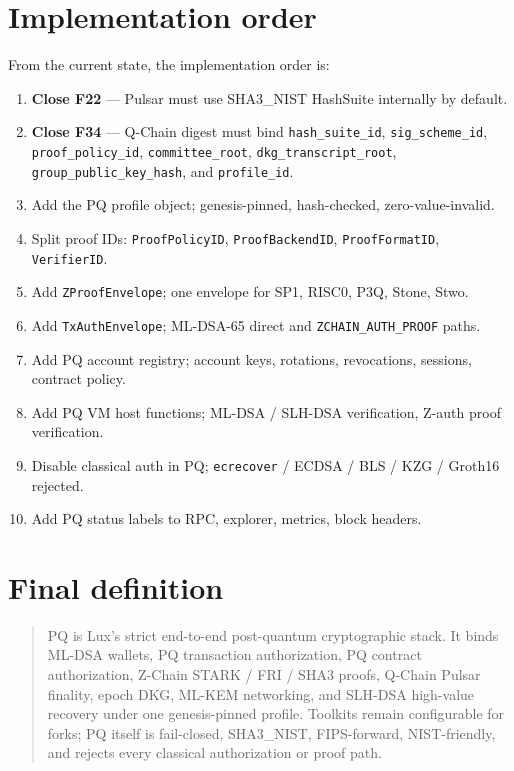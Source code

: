 \documentclass[11pt,a4paper]{article}
\newcommand{\PQ}{\textsf{PQ}}
\begin{document}
\section{Implementation order}
\label{sec:impl-order}

From the current state, the implementation order is:

\begin{enumerate}[leftmargin=*, itemsep=0pt]
\item \textbf{Close F22} --- Pulsar must use SHA3\_NIST HashSuite
internally by default.
\item \textbf{Close F34} --- Q-Chain digest must bind
\texttt{hash\_suite\_id}, \texttt{sig\_scheme\_id},
\texttt{proof\_policy\_id}, \texttt{committee\_root},
\texttt{dkg\_transcript\_root}, \texttt{group\_public\_key\_hash},
and \texttt{profile\_id}.
\item Add the \PQ{} profile object; genesis-pinned,
hash-checked, zero-value-invalid.
\item Split proof IDs: \texttt{ProofPolicyID},
\texttt{ProofBackendID}, \texttt{ProofFormatID},
\texttt{VerifierID}.
\item Add \texttt{ZProofEnvelope}; one envelope for SP1, RISC0,
P3Q, Stone, Stwo.
\item Add \texttt{TxAuthEnvelope}; ML-DSA-65 direct and
\texttt{ZCHAIN\_AUTH\_PROOF} paths.
\item Add \PQ{} account registry; account keys, rotations,
revocations, sessions, contract policy.
\item Add \PQ{} VM host functions; ML-DSA / SLH-DSA verification,
Z-auth proof verification.
\item Disable classical auth in \PQ{}; \texttt{ecrecover}
/ ECDSA / BLS / KZG / Groth16 rejected.
\item Add \PQ{} status labels to RPC, explorer, metrics,
block headers.
\end{enumerate}

\section{Final definition}
\label{sec:final}

\begin{quote}
\PQ{} is Lux's strict end-to-end post-quantum cryptographic
stack. It binds ML-DSA wallets, \PQ{} transaction authorization,
\PQ{} contract authorization, Z-Chain STARK / FRI / SHA3 proofs,
Q-Chain Pulsar finality, epoch DKG, ML-KEM networking, and
SLH-DSA high-value recovery under one genesis-pinned profile.
Toolkits remain configurable for forks; \PQ{} itself is
fail-closed, SHA3\_NIST, FIPS-forward, NIST-friendly, and rejects
every classical authorization or proof path.
\end{quote}
\end{document}
